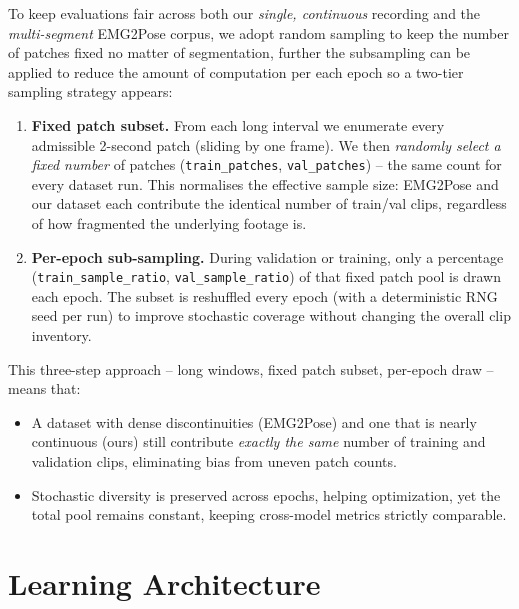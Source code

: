 To keep evaluations fair across both our \emph{single, continuous} recording and the \emph{multi-segment} EMG2Pose corpus, we adopt random sampling to keep the number of patches fixed no matter of segmentation, further the subsampling can be applied to reduce the amount of computation per each epoch so a two-tier sampling strategy appears:

\begin{enumerate}[label=\arabic*.]
  \item \textbf{Fixed patch subset.}
        From each long interval we enumerate every admissible 2-second patch
        (sliding by one frame).
        We then \emph{randomly select a fixed number} of patches
        (\texttt{train\_patches}, \texttt{val\_patches}) -- the same count for
        every dataset run.
        This normalises the effective sample size: EMG2Pose and our dataset
        each contribute the identical number of train/val clips, regardless of
        how fragmented the underlying footage is.

  \item \textbf{Per-epoch sub-sampling.}
        During validation or training, only a percentage
        (\texttt{train\_sample\_ratio}, \texttt{val\_sample\_ratio}) of that
        fixed patch pool is drawn each epoch.
        The subset is reshuffled every epoch (with a deterministic RNG seed per
        run) to improve stochastic coverage without changing the overall clip
        inventory.

\end{enumerate}

This three-step approach -- long windows, fixed patch subset, per-epoch draw -- means that:

\begin{itemize}
  \item A dataset with dense discontinuities (EMG2Pose) and one that is
        nearly continuous (ours) still contribute \emph{exactly the same}
        number of training and validation clips, eliminating bias from
        uneven patch counts.
  \item Stochastic diversity is preserved across epochs, helping optimization,
        yet the total pool remains constant, keeping cross-model metrics
        strictly comparable.
\end{itemize}

\section{Learning Architecture}

